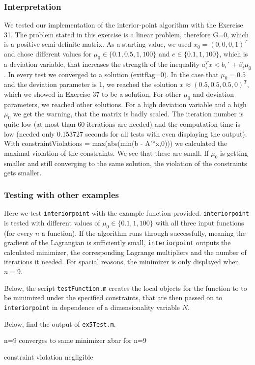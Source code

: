 \documentclass{article}
\begin{document}
\subsubsection{Interpretation}
We tested our implementation of the interior-point algorithm with the Exercise 31. The problem stated in this exercise is a linear problem, therefore G=0, which is a positive semi-definite matrix. As a starting value, we used $x_0=(0,0,0,1)^T$ and chose different values for $\mu_0 \in \{0.1,0.5,1,100\}$ and $e \in \{0.1,1,100\}$, which is a deviation variable, that increases the strength of the inequality $a_i^T x < b_i ´+ \beta_i \mu_0$. In every test we converged to a solution (exitflag=0). In the case that $\mu_0=0.5$ and the deviation parameter is 1, we reached the solution $x \approx (0.5,0.5,0.5,0)^T$, which we showed in Exercise 37 to be a solution. For other $\mu_0$ and deviation parameters, we reached other solutions. For a high deviation variable and a high $\mu_0$ we get the warning, that the matrix is badly scaled. The iteration number is quite low (at most than 60 iterations are needed) and the computation time is low (needed only 0.153727 seconds for all tests with even displaying the output). With  constraintViolations = max(abs(min(b - A'*x,0))) we calculated the maximal violation of the constraints. We see that these are small. If $\mu_0$ is getting smaller and still converging to the same solution, the violation of the constraints gets smaller.      
\subsubsection{Testing with other examples}
Here we test \texttt{interiorpoint} with the example function provided. \texttt{interiorpoint} is tested with different values of $\mu_0\in\lbrace0.1,1,100\rbrace$ with all three input functions (for every $n$ a function). If the algorithm runs through successfully, meaning the gradient of the Lagrangian is sufficiently small, \texttt{interiorpoint} outputs the calculated minimizer, the corresponding Lagrange multipliers and the number of iterations it needed. For spacial reasons, the minimizer is only displayed when $n=9$.
 
Below, the script \texttt{testFunction.m} creates the local objects for the function to to be minimized under the specified constraints, that are then passed on to \texttt{interiorpoint} in dependence of a dimensionality variable $N$.

Below, find the output of \texttt{ex5Test.m}. 


n=9 converges to same minimizer xbar
for n=9

constraint violation negligible
\end{document}
